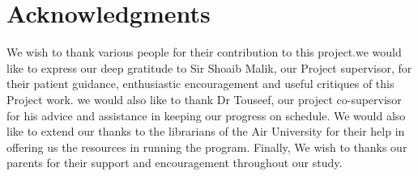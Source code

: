 \chapter*{Acknowledgments}

We wish to thank various people for their contribution to this project.we would like to express our deep gratitude to Sir Shoaib Malik, our Project supervisor, for their patient guidance, enthusiastic encouragement and useful critiques of this Project work. we would also like to thank Dr Touseef, our project co-supervisor for his advice and assistance in keeping our progress on schedule. We would also like to extend our thanks to the librarians of the Air University for their help in offering us the resources in running the program. Finally, We wish to thanks our parents for their support and encouragement throughout our study.


\vspace{10mm}



